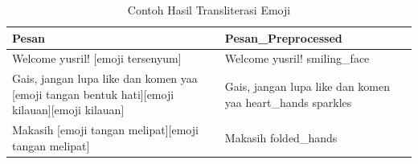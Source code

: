 \begingroup
\renewcommand{\arraystretch}{1}
\begin{table}[H]
\centering
\caption{Contoh Hasil Transliterasi Emoji}
\label{tab:emoji-transliteration}
\scriptsize
\begin{tabular}{p{5.5cm} p{5.5cm}}
\toprule
\textbf{Pesan} & \textbf{Pesan\_Preprocessed} \\
\midrule
Welcome yusril! [emoji tersenyum] &
Welcome yusril! smiling\_face \\

Gais, jangan lupa like dan komen yaa [emoji tangan bentuk hati][emoji kilauan][emoji kilauan] &
Gais, jangan lupa like dan komen yaa heart\_hands sparkles \\

Makasih [emoji tangan melipat][emoji tangan melipat] &
Makasih folded\_hands \\
\bottomrule
\end{tabular}
\end{table}
\endgroup